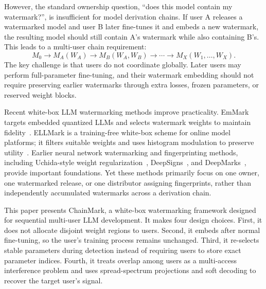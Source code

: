 \documentclass[sigconf]{acmart}
\newcommand{\method}{ChainMark}
\begin{document}
However, the standard ownership question, ``does this model contain my watermark?'', is insufficient for model derivation chains. If user A releases a watermarked model and user B later fine-tunes it and embeds a new watermark, the resulting model should still contain A's watermark while also containing B's. This leads to a multi-user chain requirement:
\begin{equation}
M_0 \rightarrow M_A(W_A) \rightarrow M_B(W_A,W_B) \rightarrow \cdots \rightarrow M_X(W_1,\ldots,W_X).
\end{equation}
The key challenge is that users do not coordinate globally. Later users may perform full-parameter fine-tuning, and their watermark embedding should not require preserving earlier watermarks through extra losses, frozen parameters, or reserved weight blocks.

Recent white-box LLM watermarking methods improve practicality. EmMark targets embedded quantized LLMs and selects watermark weights to maintain fidelity~\cite{zhang2024emmark}. ELLMark is a training-free white-box scheme for online model platforms; it filters suitable weights and uses histogram modulation to preserve utility~\cite{yuan2025ellmark}. Earlier neural network watermarking and fingerprinting methods, including Uchida-style weight regularization~\cite{uchida2017embedding}, DeepSigns~\cite{rouhani2019deepsigns}, and DeepMarks~\cite{chen2019deepmarks}, provide important foundations. Yet these methods primarily focus on one owner, one watermarked release, or one distributor assigning fingerprints, rather than independently accumulated watermarks across a derivation chain.

This paper presents \method, a white-box watermarking framework designed for sequential multi-user LLM development. It makes four design choices. First, it does not allocate disjoint weight regions to users. Second, it embeds after normal fine-tuning, so the user's training process remains unchanged. Third, it re-selects stable parameters during detection instead of requiring users to store exact parameter indices. Fourth, it treats overlap among users as a multi-access interference problem and uses spread-spectrum projections and soft decoding to recover the target user's signal.
\end{document}
